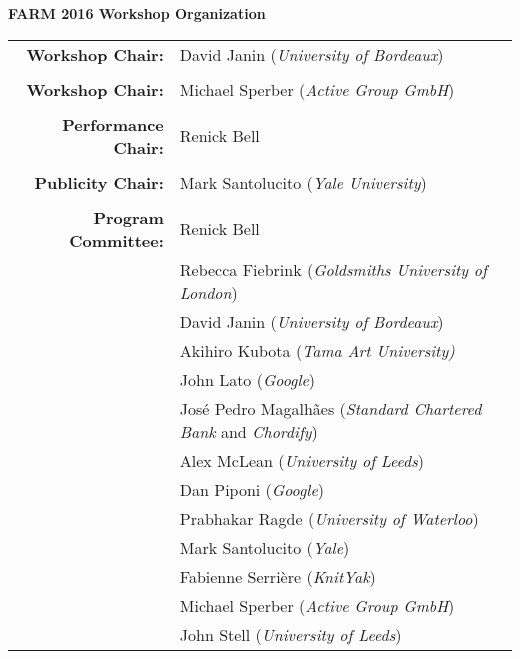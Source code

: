 \documentclass[letter]{sigplanconf}
\begin{document}
\vspace{2mm}

\newpage
\begin{center}
{\bfseries \Huge FARM 2016 Workshop Organization}
\end{center}

\bigskip

\large
\begin{center}
\begin{tabular}{rl}

{\bf Workshop Chair:} & David Janin (\emph{University of Bordeaux})\\
\\

{\bf Workshop Chair:} & Michael Sperber (\emph{Active Group GmbH})\\
  \\

  {\bf Performance Chair:} & Renick Bell\\
  \\

{\bf Publicity Chair:} & Mark Santolucito (\emph{Yale University})\\

\\

  {\bf Program Committee:} & Renick Bell\\
                      & Rebecca Fiebrink (\emph{Goldsmiths University of London})\\
                      & David Janin (\emph{University of Bordeaux})\\
                      & Akihiro Kubota (\emph{Tama Art University)}\\
                      & John Lato (\emph{Google})\\
                      & José Pedro Magalhães (\textit{Standard Chartered Bank} and \textit{Chordify})\\
                      & Alex McLean (\emph{University of Leeds})\\
                      & Dan Piponi (\emph{Google})\\
                      & Prabhakar Ragde (\emph{University of Waterloo})\\
                      & Mark Santolucito (\emph{Yale})\\
                      & Fabienne Serrière (\emph{KnitYak})\\
                      & Michael Sperber (\emph{Active Group GmbH})\\
                      & John Stell (\emph{University of Leeds})
\end{tabular}
\end{center}

\vspace{2mm}
\end{document}
